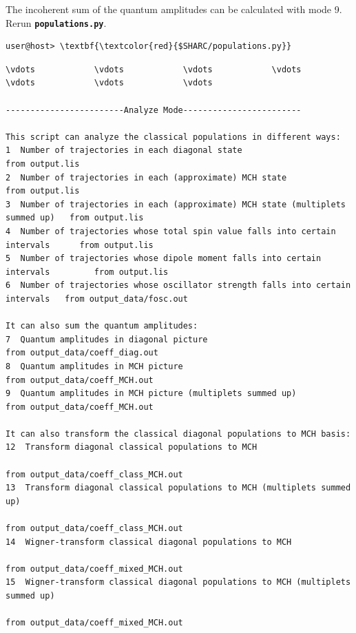 \documentclass[a4paper,11pt,DIV=15,openany]{scrbook}
\newcommand{\ttt}[1]{\textbf{\texttt{#1}}}
\begin{document}
\normalsize
The incoherent sum of the quantum amplitudes can be calculated with mode 9. Rerun \ttt{populations.py}.
\begin{Verbatim}[commandchars=\\\{\}]
user@host> \textbf{\textcolor{red}{$SHARC/populations.py}}
\end{Verbatim}

\begin{oframed}
\footnotesize\begin{Verbatim}[commandchars=\\\{\}]
\vdots            \vdots            \vdots            \vdots            \vdots            \vdots            \vdots            

------------------------Analyze Mode------------------------

This script can analyze the classical populations in different ways:
1  Number of trajectories in each diagonal state                                   from output.lis
2  Number of trajectories in each (approximate) MCH state                          from output.lis
3  Number of trajectories in each (approximate) MCH state (multiplets summed up)   from output.lis
4  Number of trajectories whose total spin value falls into certain intervals      from output.lis
5  Number of trajectories whose dipole moment falls into certain intervals         from output.lis
6  Number of trajectories whose oscillator strength falls into certain intervals   from output_data/fosc.out

It can also sum the quantum amplitudes:
7  Quantum amplitudes in diagonal picture                                    from output_data/coeff_diag.out
8  Quantum amplitudes in MCH picture                                         from output_data/coeff_MCH.out
9  Quantum amplitudes in MCH picture (multiplets summed up)                  from output_data/coeff_MCH.out

It can also transform the classical diagonal populations to MCH basis:
12  Transform diagonal classical populations to MCH
                                                                        from output_data/coeff_class_MCH.out
13  Transform diagonal classical populations to MCH (multiplets summed up)
                                                                        from output_data/coeff_class_MCH.out 
14  Wigner-transform classical diagonal populations to MCH
                                                                        from output_data/coeff_mixed_MCH.out
15  Wigner-transform classical diagonal populations to MCH (multiplets summed up)
                                                                        from output_data/coeff_mixed_MCH.out


\end{Verbatim}
\end{oframed}
\end{document}
